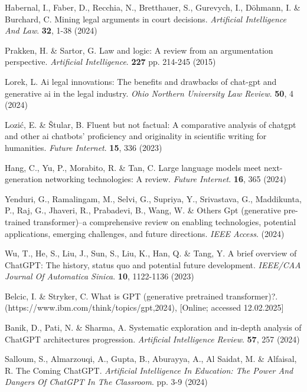 \documentclass[preprint,12pt,number]{elsarticle}
\begin{document}
\begin{thebibliography}{00}
Habernal, I., Faber, D., Recchia, N., Bretthauer, S., Gurevych, I., Döhmann, I. \& Burchard, C. Mining legal arguments in court decisions. {\em Artificial Intelligence And Law}. \textbf{32}, 1-38 (2024)

Prakken, H. \& Sartor, G. Law and logic: A review from an argumentation perspective. {\em Artificial Intelligence}. \textbf{227} pp. 214-245 (2015)

Lorek, L. Ai legal innovations: The benefits and drawbacks of chat-gpt and generative ai in the legal industry. {\em Ohio Northern University Law Review}. \textbf{50}, 4 (2024)

Lozić, E. \& Štular, B. Fluent but not factual: A comparative analysis of chatgpt and other ai chatbots’ proficiency and originality in scientific writing for humanities. {\em Future Internet}. \textbf{15}, 336 (2023)

Hang, C., Yu, P., Morabito, R. \& Tan, C. Large language models meet next-generation networking technologies: A review. {\em Future Internet}. \textbf{16}, 365 (2024)

Yenduri, G., Ramalingam, M., Selvi, G., Supriya, Y., Srivastava, G., Maddikunta, P., Raj, G., Jhaveri, R., Prabadevi, B., Wang, W. \& Others Gpt (generative pre-trained transformer)–a comprehensive review on enabling technologies, potential applications, emerging challenges, and future directions. {\em IEEE Access}. (2024)

Wu, T., He, S., Liu, J., Sun, S., Liu, K., Han, Q. \& Tang, Y. A brief overview of ChatGPT: The history, status quo and potential future development. {\em IEEE/CAA Journal Of Automatica Sinica}. \textbf{10}, 1122-1136 (2023)

Belcic, I. \& Stryker, C. What is GPT (generative pretrained transformer)?. (https://www.ibm.com/think/topics/gpt,2024), [Online; accessed 12.02.2025]

Banik, D., Pati, N. \& Sharma, A. Systematic exploration and in-depth analysis of ChatGPT architectures progression. {\em Artificial Intelligence Review}. \textbf{57}, 257 (2024)

Salloum, S., Almarzouqi, A., Gupta, B., Aburayya, A., Al Saidat, M. \& Alfaisal, R. The Coming ChatGPT. {\em Artificial Intelligence In Education: The Power And Dangers Of ChatGPT In The Classroom}. pp. 3-9 (2024)


\end{thebibliography}
\end{document}
